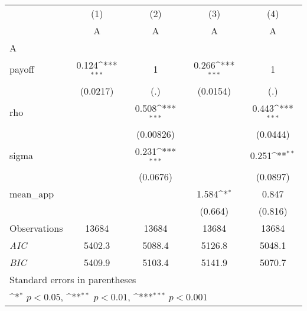 {
\def\sym#1{\ifmmode^{#1}\else\(^{#1}\)\fi}
\begin{tabular}{l*{4}{c}}
\hline\hline
                    &\multicolumn{1}{c}{(1)}&\multicolumn{1}{c}{(2)}&\multicolumn{1}{c}{(3)}&\multicolumn{1}{c}{(4)}\\
                    &\multicolumn{1}{c}{A}&\multicolumn{1}{c}{A}&\multicolumn{1}{c}{A}&\multicolumn{1}{c}{A}\\
\hline
A                   &                     &                     &                     &                     \\
payoff              &       0.124\sym{***}&           1         &       0.266\sym{***}&           1         \\
                    &    (0.0217)         &         (.)         &    (0.0154)         &         (.)         \\
[1em]
rho                 &                     &       0.508\sym{***}&                     &       0.443\sym{***}\\
                    &                     &   (0.00826)         &                     &    (0.0444)         \\
[1em]
sigma               &                     &       0.231\sym{***}&                     &       0.251\sym{**} \\
                    &                     &    (0.0676)         &                     &    (0.0897)         \\
[1em]
mean\_app            &                     &                     &       1.584\sym{*}  &       0.847         \\
                    &                     &                     &     (0.664)         &     (0.816)         \\
\hline
Observations        &       13684         &       13684         &       13684         &       13684         \\
\textit{AIC}        &      5402.3         &      5088.4         &      5126.8         &      5048.1         \\
\textit{BIC}        &      5409.9         &      5103.4         &      5141.9         &      5070.7         \\
\hline\hline
\multicolumn{5}{l}{\footnotesize Standard errors in parentheses}\\
\multicolumn{5}{l}{\footnotesize \sym{*} \(p<0.05\), \sym{**} \(p<0.01\), \sym{***} \(p<0.001\)}\\
\end{tabular}
}

